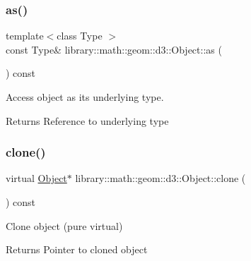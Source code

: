 \mbox{\label{classlibrary_1_1math_1_1geom_1_1d3_1_1_object_a0428ee9010710f5ec7d055a86cc586f8}} 
\subsubsection{\texorpdfstring{as()}{as()}}
{\footnotesize\ttfamily template$<$class Type $>$ \\
const Type\& library\+::math\+::geom\+::d3\+::\+Object\+::as (\begin{DoxyParamCaption}{ }\end{DoxyParamCaption}) const\hspace{0.3cm}{\ttfamily [inline]}}



Access object as its underlying type. 

\begin{DoxyReturn}{Returns}
Reference to underlying type 
\end{DoxyReturn}
\mbox{\label{classlibrary_1_1math_1_1geom_1_1d3_1_1_object_a1a784c6b359e0eb97cd34fabc42f2f3f}} 
\subsubsection{\texorpdfstring{clone()}{clone()}}
{\footnotesize\ttfamily virtual \hyperlink{classlibrary_1_1math_1_1geom_1_1d3_1_1_object}{Object}$\ast$ library\+::math\+::geom\+::d3\+::\+Object\+::clone (\begin{DoxyParamCaption}{ }\end{DoxyParamCaption}) const\hspace{0.3cm}{\ttfamily [pure virtual]}}



Clone object (pure virtual) 

\begin{DoxyReturn}{Returns}
Pointer to cloned object 
\end{DoxyReturn}



